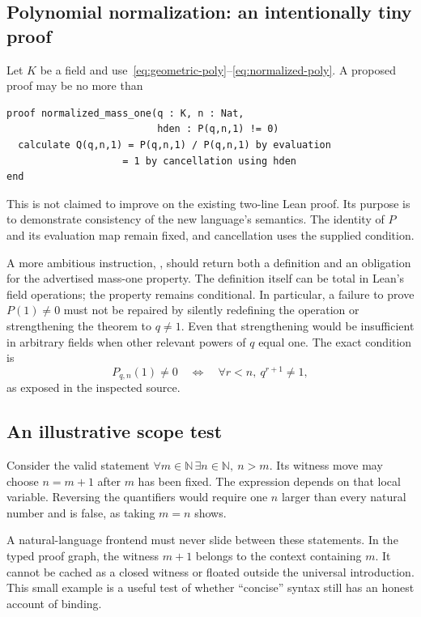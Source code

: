 \documentclass[11pt,a4paper]{article}
\newcommand{\code}[1]{\texttt{\detokenize{#1}}}
\newcommand{\N}{\mathbb N}
\theoremstyle{remark}
\begin{document}
\subsection{Polynomial normalization: an intentionally tiny proof}
Let $K$ be a field and use~\eqref{eq:geometric-poly}--\eqref{eq:normalized-poly}. A proposed proof may be no more than
\par\noindent\begin{minipage}{\linewidth}
\begin{lstlisting}[caption={A small normalization proof with the hypothesis retained.}]
proof normalized_mass_one(q : K, n : Nat,
                          hden : P(q,n,1) != 0)
  calculate Q(q,n,1) = P(q,n,1) / P(q,n,1) by evaluation
                    = 1 by cancellation using hden
end
\end{lstlisting}
\end{minipage}\par
This is not claimed to improve on the existing two-line Lean proof. Its purpose is to demonstrate consistency of the new language's semantics. The identity of $P$ and its evaluation map remain fixed, and cancellation uses the supplied condition.

A more ambitious instruction, \code{normalize P at 1}, should return both a definition and an obligation for the advertised mass-one property. The definition itself can be total in Lean's field operations; the property remains conditional. In particular, a failure to prove $P(1)\ne0$ must not be repaired by silently redefining the operation or strengthening the theorem to $q\ne1$. Even that strengthening would be insufficient in arbitrary fields when other relevant powers of $q$ equal one. The exact condition is
\[
P_{q,n}(1)\ne0\quad\Longleftrightarrow\quad
\forall r<n,\ q^{r+1}\ne1,
\]
as exposed in the inspected source.

\subsection{An illustrative scope test}
Consider the valid statement $\forall m\in\N\,\exists n\in\N,\ n>m$. Its witness move may choose $n=m+1$ after $m$ has been fixed. The expression depends on that local variable. Reversing the quantifiers would require one $n$ larger than every natural number and is false, as taking $m=n$ shows.

A natural-language frontend must never slide between these statements. In the typed proof graph, the witness $m+1$ belongs to the context containing $m$. It cannot be cached as a closed witness or floated outside the universal introduction. This small example is a useful test of whether ``concise'' syntax still has an honest account of binding.
\end{document}

